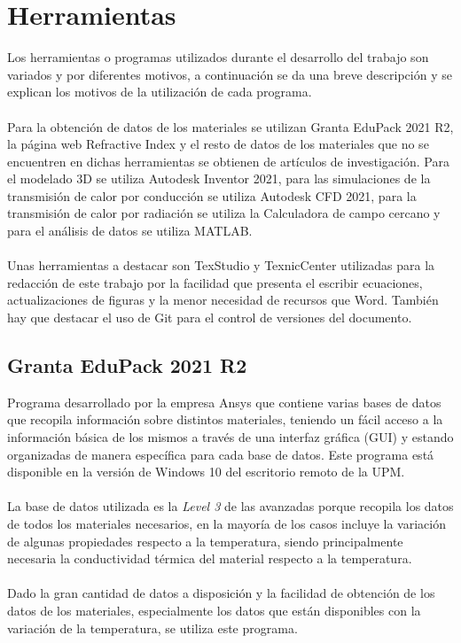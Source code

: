 \section{Herramientas}

Los herramientas o programas utilizados durante el desarrollo del trabajo son variados y por diferentes motivos, a continuación se da una breve descripción y se explican los motivos de la utilización de cada programa.\\\\
Para la obtención de datos de los materiales se utilizan Granta EduPack 2021 R2, la página web Refractive Index y el resto de datos de los materiales que no se encuentren en dichas herramientas se obtienen de artículos de investigación. Para el modelado 3D se utiliza Autodesk Inventor 2021, para las simulaciones de la transmisión de calor por conducción se utiliza Autodesk CFD 2021, para la transmisión de calor por radiación se utiliza la Calculadora de campo cercano y para el análisis de datos se utiliza MATLAB.\\\\
Unas herramientas a destacar son TexStudio y TexnicCenter utilizadas para la redacción de este trabajo por la facilidad que presenta el escribir ecuaciones, actualizaciones de figuras y la menor necesidad de recursos que Word. También hay que destacar el uso de Git para el control de versiones del documento.\\
\subsection{Granta EduPack 2021 R2}
Programa desarrollado por la empresa Ansys que contiene varias bases de datos que recopila información sobre distintos materiales, teniendo un fácil acceso a la información básica de los mismos a través de una interfaz gráfica (GUI) y estando organizadas de manera específica para cada base de datos. Este programa está disponible en la versión de Windows 10 del escritorio remoto de la UPM.\\\\
La base de datos utilizada es la \textit{Level 3} de las avanzadas porque recopila los datos de todos los materiales necesarios, en la mayoría de los casos incluye la variación de algunas propiedades respecto a la temperatura, siendo principalmente necesaria la conductividad térmica del material respecto a la temperatura.\\\\
Dado la gran cantidad de datos a disposición y la facilidad de obtención de los datos de los materiales, especialmente los datos que están disponibles con la variación de la temperatura, se utiliza este programa.
